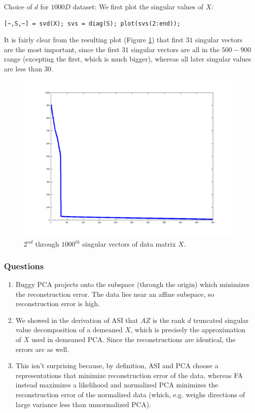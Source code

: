 \documentclass[11pt]{article}
\begin{document}
Choice of $d$ for $1000D$ dataset: We first plot the singular values of $X$:
\begin{verbatim}
[~,S,~] = svd(X); svs = diag(S); plot(svs(2:end));
\end{verbatim}
It is fairly clear from the resulting plot (Figure \ref{fig:s_vals}) that first
$31$ singular vectors are the most important, since the first $31$ singular
vectors are all in the $500-900$ range (excepting the first, which is much
bigger), whereas all later singular values are less than $30$.
\begin{figure}[h!]
\centering
\quad\;
\includegraphics[trim=10mm 0mm 10mm 0mm, clip=true, width=0.6\linewidth]{s_vals}
\vspace{-6mm}
\caption{$2^{nd}$ through $1000^{th}$ singular vectors of data matrix $X$.}
\label{fig:s_vals}
\end{figure}
\vspace{-2mm}
\subsubsection*{Questions}
\begin{enumerate}
\item Buggy PCA projects onto the subspace (through the origin) which
minimizes the reconstruction error. The data lies near an affine subspace, so
reconstruction error is high.
\item We showed in the derivation of ASI that $AZ$ is the rank $d$ truncated
singular value decomposition of a demeaned $X$, which is precisely the
approximation of $X$ used in demeaned PCA. Since the reconstructions are
identical, the errors are as well.
\item This isn't surprising because, by definition, ASI and PCA choose a
representations that minimize reconstruction error of the data, whereas FA
instead maximizes a likelihood and normalized PCA minimizes the reconstruction
error of the normalized data (which, e.g. weighs directions of large variance
less than unnormalized PCA).
\end{enumerate}
\end{document}

